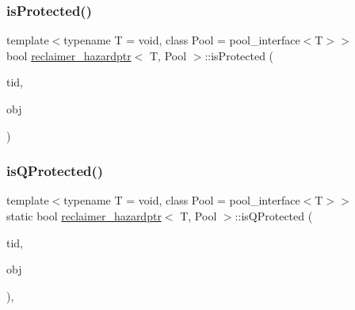 \mbox{\label{classreclaimer__hazardptr_a660201dad3c7a18dce5a9551691f4869}} 
\subsubsection{\texorpdfstring{is\+Protected()}{isProtected()}}
{\footnotesize\ttfamily template$<$typename T  = void, class Pool  = pool\+\_\+interface$<$\+T$>$$>$ \\
bool \hyperlink{classreclaimer__hazardptr}{reclaimer\+\_\+hazardptr}$<$ T, Pool $>$\+::is\+Protected (\begin{DoxyParamCaption}\item[{const int}]{tid,  }\item[{T $\ast$const}]{obj }\end{DoxyParamCaption})\hspace{0.3cm}{\ttfamily [inline]}}

\mbox{\label{classreclaimer__hazardptr_acdae0c67eb9c9564394fe473e0f7de08}} 
\subsubsection{\texorpdfstring{is\+Q\+Protected()}{isQProtected()}}
{\footnotesize\ttfamily template$<$typename T  = void, class Pool  = pool\+\_\+interface$<$\+T$>$$>$ \\
static bool \hyperlink{classreclaimer__hazardptr}{reclaimer\+\_\+hazardptr}$<$ T, Pool $>$\+::is\+Q\+Protected (\begin{DoxyParamCaption}\item[{const int}]{tid,  }\item[{T $\ast$const}]{obj }\end{DoxyParamCaption})\hspace{0.3cm}{\ttfamily [inline]}, {\ttfamily [static]}}

\mbox{\label{classreclaimer__hazardptr_a7726a1aae8e0c6241f2d8789795c3819}} 
